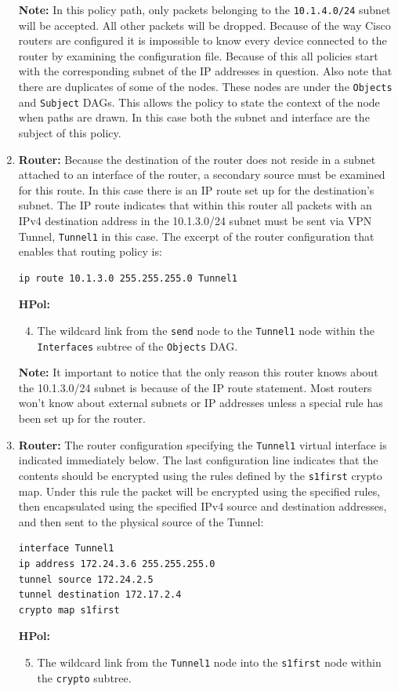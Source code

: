 \documentclass[12pt,letterpaper]{report}
\newcommand{\node}[1]{\texttt{#1}}
\newcommand{\tbf}[1]{\textbf{#1}}
\begin{document}
\begin{enumerate}
{\begin{enumerate}
		\end{enumerate}
		{\tbf{Note:} In this policy path, only packets belonging to the {\node{10.1.4.0/24}} subnet will be accepted. All other packets will be dropped. Because of the way Cisco routers are configured it is impossible to know every device connected to the router by examining the configuration file. Because of this all policies start with the corresponding subnet of the IP addresses in question. Also note that there are duplicates of some of the nodes. These nodes are under the \texttt{Objects} and \texttt{Subject} DAGs. This allows the policy to state the context of the node when paths are drawn. In this case both the subnet and interface are the subject of this policy.}
	}
	\item%
	{%
		{\tbf{Router:} Because the destination of the router does not reside in a subnet attached to an interface of the router, a secondary source must be examined for this route. In this case there is an IP route set up for the destination's subnet. The IP route indicates that within this router all packets with an IPv4 destination address in the 10.1.3.0/24 subnet must be sent via VPN Tunnel, {\node{Tunnel1}} in this case. The excerpt of the router configuration that enables that routing policy is:}
		\begin{lstlisting}[style=hermes]
ip route 10.1.3.0 255.255.255.0 Tunnel1
		\end{lstlisting}
		{\tbf{HPol:}}
		\begin{enumerate}
			\setcounter{enumii}{3}
			\item {The wildcard link from the {\node{send}} node to the {\node{Tunnel1}} node within the {\node{Interfaces}} subtree of the \texttt{Objects} DAG.}
		\end{enumerate}
		\tbf{Note:} It important to notice that the only reason this router knows about the 10.1.3.0/24 subnet is because of the IP route statement. Most routers won't know about external subnets or IP addresses unless a special rule has been set up for the router. 
	}
	\item%
	{%
		{\tbf{Router:} The router configuration specifying the {\node{Tunnel1}} virtual interface is indicated immediately below. The last configuration line indicates that the contents should be encrypted using the rules defined by the {\node{s1first}} crypto map. Under this rule the packet will be encrypted using the specified rules, then encapsulated using the specified IPv4 source and destination addresses, and then sent to the physical source of the Tunnel:}
		\begin{lstlisting}[style=hermes]
interface Tunnel1
ip address 172.24.3.6 255.255.255.0
tunnel source 172.24.2.5
tunnel destination 172.17.2.4
crypto map s1first
		\end{lstlisting}
		{\tbf{HPol:}}
		\begin{enumerate}
			\setcounter{enumii}{4}
			\item {The wildcard link from the {\node{Tunnel1}} node into the {\node{s1first}} node within the {\node{crypto}} subtree.}
		\end{enumerate}	
		
}
\end{enumerate}
\end{document}
